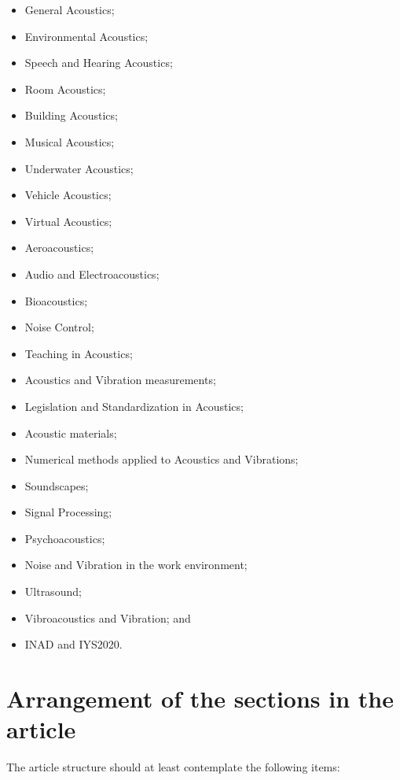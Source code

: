 \documentclass[12pt, a4paper, twoside, twocolumn]{article}
\begin{document}
\begin{itemize}[noitemsep,topsep=0ex] \itemsep=3pt
    \item General Acoustics;
    \item Environmental Acoustics;
    \item Speech and Hearing Acoustics;
    \item Room Acoustics;
    \item Building Acoustics;
    \item Musical Acoustics;
    \item Underwater Acoustics;
    \item Vehicle Acoustics;
    \item Virtual Acoustics;
    \item Aeroacoustics;
    \item Audio and Electroacoustics;
    \item Bioacoustics;
    \item Noise Control;
    \item Teaching in Acoustics;
    \item Acoustics and Vibration measurements;
    \item Legislation and Standardization in Acoustics;
    \item Acoustic materials;
    \item Numerical methods applied to Acoustics and Vibrations;
    \item Soundscapes;
    \item Signal Processing;
    \item Psychoacoustics;
    \item Noise and Vibration in the work environment;
    \item Ultrasound;
    \item Vibroacoustics and Vibration; and
    \item INAD and IYS2020.
\end{itemize}

\section{Arrangement of the sections in the article}

The article structure should at least contemplate the following items:
\end{document}
